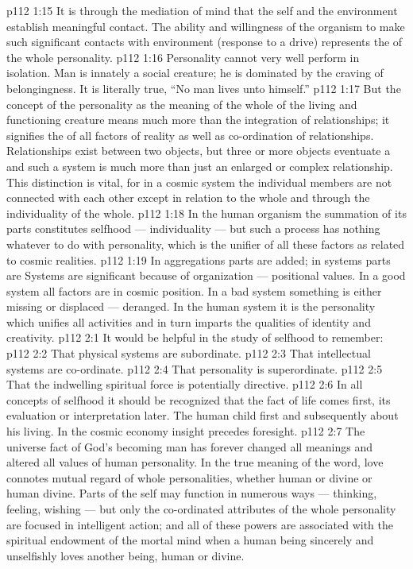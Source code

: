 \vs p112 1:15 It is through the mediation of mind that the self and the environment establish meaningful contact. The ability and willingness of the organism to make such significant contacts with environment (response to a drive) represents the  of the whole personality.
\vs p112 1:16 Personality cannot very well perform in isolation. Man is innately a social creature; he is dominated by the craving of belongingness. It is literally true, “No man lives unto himself.”
\vs p112 1:17 But the concept of the personality as the meaning of the whole of the living and functioning creature means much more than the integration of relationships; it signifies the  of all factors of reality as well as co\hyp{}ordination of relationships. Relationships exist between two objects, but three or more objects eventuate a  and such a system is much more than just an enlarged or complex relationship. This distinction is vital, for in a cosmic system the individual members are not connected with each other except in relation to the whole and through the individuality of the whole.
\vs p112 1:18 In the human organism the summation of its parts constitutes selfhood --- individuality --- but such a process has nothing whatever to do with personality, which is the unifier of all these factors as related to cosmic realities.
\vs p112 1:19 In aggregations parts are added; in systems parts are  Systems are significant because of organization --- positional values. In a good system all factors are in cosmic position. In a bad system something is either missing or displaced --- deranged. In the human system it is the personality which unifies all activities and in turn imparts the qualities of identity and creativity.
\vs p112 2:1 It would be helpful in the study of selfhood to remember:
\vs p112 2:2 \bibnobreakspace That physical systems are subordinate.
\vs p112 2:3 \bibnobreakspace That intellectual systems are co\hyp{}ordinate.
\vs p112 2:4 \bibnobreakspace That personality is superordinate.
\vs p112 2:5 \bibnobreakspace That the indwelling spiritual force is potentially directive.
\vs p112 2:6 \pc In all concepts of selfhood it should be recognized that the fact of life comes first, its evaluation or interpretation later. The human child first  and subsequently  about his living. In the cosmic economy insight precedes foresight.
\vs p112 2:7 \pc The universe fact of God’s becoming man has forever changed all meanings and altered all values of human personality. In the true meaning of the word, love connotes mutual regard of whole personalities, whether human or divine or human  divine. Parts of the self may function in numerous ways --- thinking, feeling, wishing --- but only the co\hyp{}ordinated attributes of the whole personality are focused in intelligent action; and all of these powers are associated with the spiritual endowment of the mortal mind when a human being sincerely and unselfishly loves another being, human or divine.
